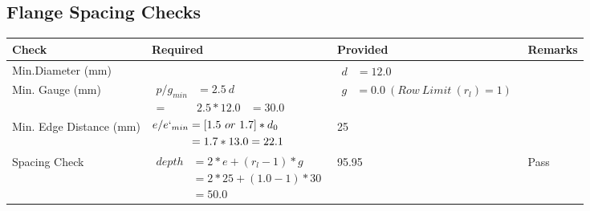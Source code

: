 \documentclass{article}%
\begin{document}
\subsection{Flange Spacing Checks}%
\label{subsec:FlangeSpacingChecks}%
\renewcommand{\arraystretch}{1.2}%
\begin{longtable}{|p{2.5cm}|p{7.5cm}|p{5cm}|p{1cm}|}%
\hline%
\rowcolor{OsdagGreen}%
Check&Required&Provided&Remarks\\%
\hline%
\endhead%
\hline%
Min.Diameter (mm)&&$\begin{aligned} d &=12.0\end{aligned}$&\\%
\hline%
Min. Gauge (mm)&$\begin{aligned}p/g_{min}&= 2.5 ~ d&\\ =&2.5*12.0&=30.0\end{aligned}$&$\begin{aligned} g &=0.0~(Row~Limit~(r_l) = 1)\end{aligned}$&\\%
\hline%
Min. Edge Distance (mm)&$\begin{aligned}e/e`_{min} &=[1.5~or~ 1.7] * d_0\\ &=1.7*13.0=22.1 \end{aligned}$&25&\\%
\hline%
Spacing Check&$\begin{aligned} depth & = 2 * e + (r_l -1) * g\\ & = 2 * 25+(1.0-1)*30\\ & = 50.0\end{aligned}$&95.95&Pass\\%
\hline%
\end{longtable}

%
\newpage%
\end{document}
